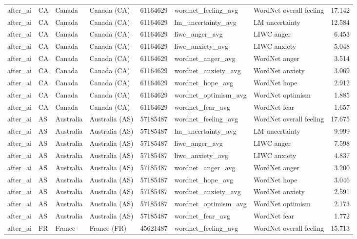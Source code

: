 \begin{tabular}{llllrllr}
after\_ai & CA & Canada & Canada (CA) & 61164629 & wordnet\_feeling\_avg & WordNet overall feeling & 17.142 \\
after\_ai & CA & Canada & Canada (CA) & 61164629 & lm\_uncertainty\_avg & LM uncertainty & 12.584 \\
after\_ai & CA & Canada & Canada (CA) & 61164629 & liwc\_anger\_avg & LIWC anger & 6.453 \\
after\_ai & CA & Canada & Canada (CA) & 61164629 & liwc\_anxiety\_avg & LIWC anxiety & 5.048 \\
after\_ai & CA & Canada & Canada (CA) & 61164629 & wordnet\_anger\_avg & WordNet anger & 3.514 \\
after\_ai & CA & Canada & Canada (CA) & 61164629 & wordnet\_anxiety\_avg & WordNet anxiety & 3.069 \\
after\_ai & CA & Canada & Canada (CA) & 61164629 & wordnet\_hope\_avg & WordNet hope & 2.912 \\
after\_ai & CA & Canada & Canada (CA) & 61164629 & wordnet\_optimism\_avg & WordNet optimism & 1.885 \\
after\_ai & CA & Canada & Canada (CA) & 61164629 & wordnet\_fear\_avg & WordNet fear & 1.657 \\
after\_ai & AS & Australia & Australia (AS) & 57185487 & wordnet\_feeling\_avg & WordNet overall feeling & 17.675 \\
after\_ai & AS & Australia & Australia (AS) & 57185487 & lm\_uncertainty\_avg & LM uncertainty & 9.999 \\
after\_ai & AS & Australia & Australia (AS) & 57185487 & liwc\_anger\_avg & LIWC anger & 7.598 \\
after\_ai & AS & Australia & Australia (AS) & 57185487 & liwc\_anxiety\_avg & LIWC anxiety & 4.837 \\
after\_ai & AS & Australia & Australia (AS) & 57185487 & wordnet\_anger\_avg & WordNet anger & 3.200 \\
after\_ai & AS & Australia & Australia (AS) & 57185487 & wordnet\_hope\_avg & WordNet hope & 3.046 \\
after\_ai & AS & Australia & Australia (AS) & 57185487 & wordnet\_anxiety\_avg & WordNet anxiety & 2.591 \\
after\_ai & AS & Australia & Australia (AS) & 57185487 & wordnet\_optimism\_avg & WordNet optimism & 2.173 \\
after\_ai & AS & Australia & Australia (AS) & 57185487 & wordnet\_fear\_avg & WordNet fear & 1.772 \\
after\_ai & FR & France & France (FR) & 45621487 & wordnet\_feeling\_avg & WordNet overall feeling & 15.713 \\

\end{tabular}
